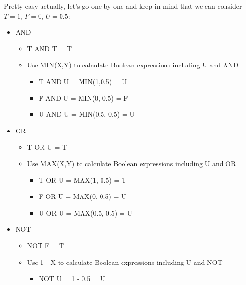 \documentclass{article}
\begin{document}
Pretty easy actually, let's go one by one and keep in mind that we can consider $T = 1$, $F = 0$, $U = 0.5$:
\begin{itemize}
    \item AND
    \begin{itemize}
        \item T AND T = T
        \item Use MIN(X,Y) to calculate Boolean expressions including U and AND
        \begin{itemize}
            \item T AND U = MIN(1,0.5) = U
            \item F AND U = MIN(0, 0.5) = F
            \item U AND U = MIN(0.5, 0.5) = U
        \end{itemize}
    \end{itemize}
    \item OR
    \begin{itemize}
        \item T OR U = T
        \item Use MAX(X,Y) to calculate Boolean expressions including U and OR
        \begin{itemize}
            \item T OR U = MAX(1, 0.5) = T
            \item F OR U = MAX(0, 0.5) = U
            \item U OR U = MAX(0.5, 0.5) = U
        \end{itemize}
    \end{itemize}
    \item NOT
    \begin{itemize}
        \item NOT F = T
        \item Use 1 - X to calculate Boolean expressions including U and NOT
        \begin{itemize}
            \item NOT U = 1 - 0.5 = U
        \end{itemize}
    \end{itemize}
\end{itemize}
\end{document}

